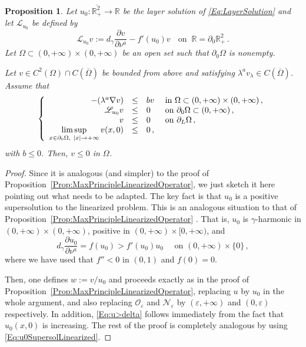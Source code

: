 \documentclass[12pt,reqno]{amsart}
\newtheorem{proposition}[theorem]{Proposition}
\theoremstyle{definition}
\theoremstyle{remark}
\newcommand{\con}[1]{\mathbb{#1}}
\newcommand{\R}{\con{R}} %
\newcommand{\ncal}{\mathcal{N}}
\newcommand{\ocal}{\mathcal{O}}
\newcommand{\s}{\gamma}
\newcommand\beqc[1]{\left\{\begin{array}{#1}}
\newcommand\eeqc{\end{array} \right.}
\def\PDEsystem{rcll}
\let\div\relax
\DeclareMathOperator{\div}{div}
\def\ds{\displaystyle}
\numberwithin{equation}{section}
\begin{document}
\begin{proposition}
\label{Prop:MaxPrincipleLinearizedOperator2D}
Let $u_0:\overline{\R^2_+}\to \R$ be the layer solution of \eqref{Eq:LayerSolution} and let $\mathscr{L}_{u_0} $ be defined by 
$$
\mathscr{L}_{u_0} v := d_\s \dfrac{\partial v}{\partial \nu^a}  -f'(u_0) v\,\ \ \text{ on } \ \R=\partial_0\R^2_+\,.
$$
Let $\Omega \subset (0,+\infty) \times (0,+\infty)$ be an open set such that $\partial_0 \Omega$ is nonempty. 

Let $v \in C^2 (\Omega)\cap C(\overline{\Omega})$ be bounded from above and satisfying $\lambda^a v_\lambda \in C (\overline{\Omega})$. Assume that
$$
\beqc{\PDEsystem}
-\div(\lambda^a \nabla v) &\leq& b v & \text{ in } \Omega \subset (0, +\infty)\times (0,+\infty)\,, \\
\mathscr{L}_{u_0} v &\leq & 0 & \text{ on } \partial_0 \Omega \subset (0,+\infty) \,, \\
v & \leq & 0 & \text{ on } \partial_L \Omega\,,\\
\ds \limsup_{x\in \partial_0 \Omega,\ |x|\to +\infty} v(x,0) & \leq & 0\,,
\eeqc
$$
with $b \leq 0$. Then, $v\leq 0$ in $\Omega$.
\end{proposition}

\begin{proof}
Since it is analogous (and simpler) to the proof of Proposition~\ref{Prop:MaxPrincipleLinearizedOperator}, we just sketch it here pointing out what needs to be adapted. The key fact is that $u_0$ is a positive supersolution to the linearized problem. This is an analogous situation to that of Proposition~\ref{Prop:MaxPrincipleLinearizedOperator} . That is, $u_0$ is $\s$-harmonic in $(0,+\infty)\times (0,+\infty)$, positive in $(0,+\infty)\times [0,+\infty)$, and
\begin{equation}
\label{Eq:u0SupersolLinearized}
d_\s \dfrac{\partial u_0}{\partial \nu^a}  = f(u_0) > f'(u_0) u_0 \quad \textrm{ on } (0, +\infty)\times \{0\}\,,
\end{equation}
where we have used that $f''<0$ in $(0,1)$ and $f(0)=0$.

 
Then, one defines $w := v/u_0$ and proceeds exactly as in the proof of Proposition~\ref{Prop:MaxPrincipleLinearizedOperator}, replacing  $u$ by $u_0$ in the whole argument, and also replacing  $\ocal_\varepsilon$ and $\ncal_\varepsilon$ by $(\varepsilon,+\infty)$ and $(0,\varepsilon)$ respectively. In addition, \eqref{Eq:u>delta} follows immediately from the fact that $u_0(x,0)$ is increasing. The rest of the proof is completely analogous by using \eqref{Eq:u0SupersolLinearized}.
\end{proof}
\end{document}
